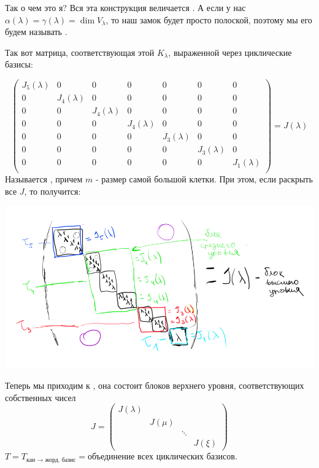 Так о чем это я? Вся эта конструкция величается . А если у нас $\alpha(\lambda)=\gamma(\lambda)=\dim V_\lambda$, то наш замок будет просто полоской, поэтому мы его будем называть .

Так вот матрица, соответствующая этой $K_\lambda$, выраженной через циклические базисы:

$$
\begin{pmatrix}
    J_5(\lambda) & 0 & 0 & 0 & 0 & 0 & 0\\
    0 & J_4(\lambda)& 0 & 0 & 0 & 0 & 0\\
   0 & 0 & J_4(\lambda) & 0  & 0 & 0 & 0\\
    0 & 0 & 0 & J_4(\lambda)  & 0 & 0 & 0\\
     0 & 0 & 0 & 0  & J_3(\lambda)& 0 & 0\\
      0 & 0 & 0 & 0  & 0 & J_3(\lambda) & 0\\
     0 & 0 & 0 & 0  & 0 & 0 & J_1(\lambda)\\
\end{pmatrix}=J(\lambda)
$$
Называется , причем $m$ - размер самой большой клетки. При этом, если раскрыть все $J$, то получится:
\begin{center}
   \includegraphics[width = 20cm]{assets/7_9-zhordan-high-matrix.png}
\end{center}


Теперь мы приходим к , она состоит блоков верхнего уровня, соответствующих собственных чисел
$$J = \begin{pmatrix}
    J(\lambda) & & & \\
    & J(\mu) & & \\
    & & \ddots & \\
    & & &  J(\xi)
\end{pmatrix}$$
$T = T_{\text{кан $\rightarrow$ жорд. базис}} = \text{объединение всех циклических базисов}$.

